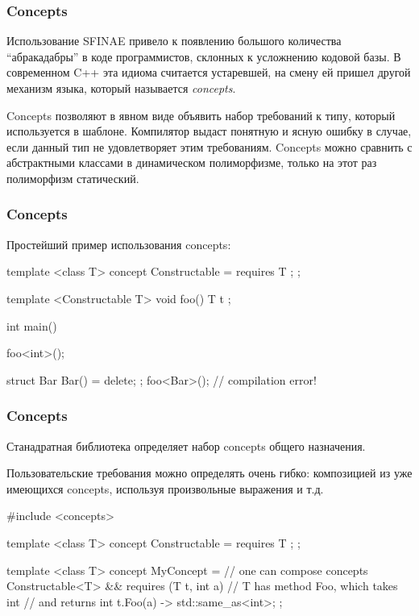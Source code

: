 \documentclass[compress, 8pt, aspectratio=169]{beamer}
\begin{document}
  \begin{frame}[fragile]

    \frametitle{Concepts}

    Использование SFINAE привело к появлению большого
    количества \enquote{абракадабры} в коде программистов,
    склонных к усложнению кодовой базы.
    В современном C++ эта идиома считается устаревшей,
    на смену ей пришел другой механизм языка, который
    называется \textit{concepts}\footnotemark{}.


    \hfill \break
    Concepts позволяют в явном виде объявить набор требований к типу,
    который используется в шаблоне.
    Компилятор выдаст понятную и ясную ошибку в случае, если данный тип
    не удовлетворяет этим требованиям.
    Concepts можно сравнить с абстрактными классами в динамическом полиморфизме,
    только на этот раз полиморфизм статический.

  \end{frame}

  \begin{frame}[fragile]

    \frametitle{Concepts}

    Простейший пример использования concepts:

    \begin{myinplacelisting}[minted language=cpp]
template <class T>
concept Constructable = requires {
    T {};
};

template <Constructable T>
void foo() {
    T t {};
}

int main() {
    foo<int>();

    struct Bar { Bar() = delete; };
    foo<Bar>(); // compilation error!
}
    \end{myinplacelisting}

  \end{frame}

  \begin{frame}[fragile]

    \frametitle{Concepts}

    Станадратная библиотека определяет набор concepts общего назначения\footnotemark{}.


    Пользовательские требования можно определять очень гибко:
    композицией из уже имеющихся concepts, используя произвольные
    выражения и т.д.

    \begin{myinplacelisting}[minted language=cpp]
#include <concepts>

template <class T>
concept Constructable = requires {
    T {};
};

template <class T>
concept MyConcept =
    // one can compose concepts
    Constructable<T> &&
    requires (T t, int a) {
        // T has method Foo, which takes int
        // and returns int
        { t.Foo(a) } -> std::same_as<int>;
    };
    \end{myinplacelisting}

  \end{frame}
\end{document}
